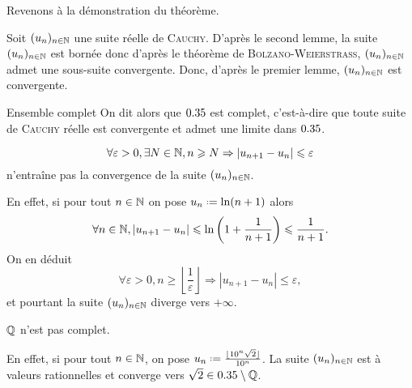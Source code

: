 Revenons à la démonstration du théorème.

\begin{preuve}
    Soit $(u_n)_{n \in \mathbb{N}}$ une suite réelle de \textsc{Cauchy}. D'après le second lemme, la suite $(u_n)_{n \in \mathbb{N}}$ est bornée donc d'après le théorème de \textsc{Bolzano}-\textsc{Weierstrass}, $(u_n)_{n \in \mathbb{N}}$ admet une sous-suite convergente. Donc, d'après le premier lemme, $(u_n)_{n \in \mathbb{N}}$ est convergente. 
\end{preuve}

\begin{defi}{Ensemble complet}
    On dit alors que $0.35$ est complet, c'est-à-dire que toute suite de \textsc{Cauchy} réelle est convergente et admet une limite dans $0.35$. 
\end{defi}

\begin{remarque}
    $$\forall \varepsilon > 0, \exists N \in \mathbb{N}, n \geqslant N \Rightarrow |u_{n+1} - u_n| \leqslant \varepsilon$$
    n'entraîne pas la convergence de la suite $(u_n)_{n \in \mathbb{N}}$.
\end{remarque}

En effet, si pour tout $n \in \mathbb{N}$ on pose $u_n \defeq \ln(n+1)$ alors
$$\forall n \in \mathbb{N}, |u_{n+1} - u_n| \leqslant \ln \left( 1 + \frac{1}{n+1} \right) \leqslant \frac{1}{n+1}.$$
On en déduit
$$\forall \varepsilon > 0, n \geqslant \left \lfloor \frac{1}{\varepsilon} \right \rfloor \Rightarrow |u_{n+1} - u_n| \leqslant \varepsilon,$$
et pourtant la suite $(u_n)_{n \in \mathbb{N}}$ diverge vers $+ \infty$.

\begin{remarque}
    $\mathbb{Q}$ n'est pas complet.
\end{remarque}

En effet, si pour tout $n \in \mathbb{N}$, on pose $u_n \defeq \frac{\lfloor 10^n \sqrt{2} \rfloor}{10^n}$. La suite $(u_n)_{n \in \mathbb{N}}$ est à valeurs rationnelles et converge vers $\sqrt{2} \in 0.35 \setminus \mathbb{Q}$. 